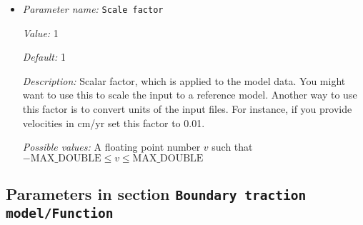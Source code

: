 \begin{itemize}
{\it Value:} 0


{\it Default:} 0


{\it Description:} Number of the first velocity file to be loaded when the model time is larger than `First velocity file model time'.


{\it Possible values:} An integer $n$ such that $-2147483648\leq n \leq 2147483647$
\item {\it Parameter name:} {\tt Scale factor}
\label{parameters:Boundary traction model/Ascii data model/Scale factor}
\label{parameters:Boundary_20traction_20model/Ascii_20data_20model/Scale_20factor}


{\it Value:} 1


{\it Default:} 1


{\it Description:} Scalar factor, which is applied to the model data. You might want to use this to scale the input to a reference model. Another way to use this factor is to convert units of the input files. For instance, if you provide velocities in cm/yr set this factor to 0.01.


{\it Possible values:} A floating point number $v$ such that $-\text{MAX\_DOUBLE} \leq v \leq \text{MAX\_DOUBLE}$
\end{itemize}

\subsection{Parameters in section \tt Boundary traction model/Function}
\label{parameters:Boundary_20traction_20model/Function}

